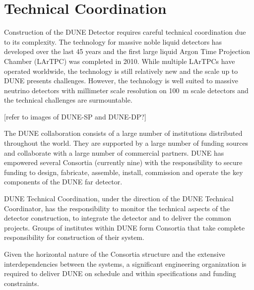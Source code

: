 \chapter{Technical Coordination}
\label{ch:fdsp-coord}

Construction of the DUNE Detector requires careful technical
coordination due to its complexity. The technology for massive noble
liquid detectors has developed over the last 45 years and the first
large liquid Argon Time Projection Chamber (LArTPC) was completed in
2010. While multiple LArTPCs have operated worldwide, the technology
is still relatively new and the scale up to DUNE presents
challenges. However, the technology is well suited to massive neutrino
detectors with millimeter scale resolution on 100~m scale detectors and
the technical challenges are surmountable.

[refer to images of DUNE-SP and DUNE-DP?]

The DUNE collaboration consists of a large number of institutions distributed throughout
the world. They are supported by a large number of funding sources and
collaborate with a large number of commercial partners. DUNE has
empowered several Consortia (currently nine) with the responsibility
to secure funding to design, fabricate, assemble, install,
commission and operate the key components of the DUNE far detector.

DUNE Technical Coordination, under the direction of the DUNE Technical
Coordinator, has the responsibility to monitor the technical aspects of
the detector construction, to integrate the
detector and to deliver the common projects. Groups of institutes
within DUNE form Consortia that take complete responsibility for
construction of their system.

Given the horizontal nature of the Consortia structure and the
extensive interdependencies between the systems, a significant
engineering organization is required to deliver DUNE on schedule and
within specifications and funding constraints.


